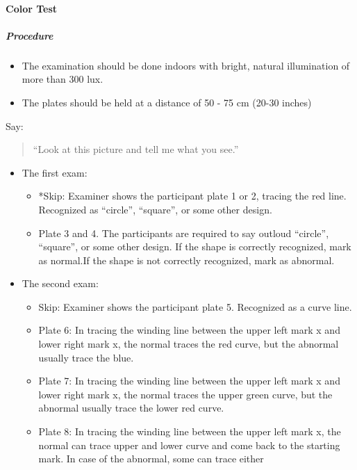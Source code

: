 \documentclass[]{article}
\providecommand{\tightlist}{%
  \setlength{\itemsep}{0pt}\setlength{\parskip}{0pt}}
\let\oldparagraph\paragraph
\renewcommand{\paragraph}[1]{\oldparagraph{#1}\mbox{}}
\let\oldsubparagraph\subparagraph
\renewcommand{\subparagraph}[1]{\oldsubparagraph{#1}\mbox{}}
\begin{document}
\paragraph{Color Test}\label{color-test}

\subparagraph{Procedure}\label{procedure-1}

\begin{itemize}
\tightlist
\item
  The examination should be done indoors with bright, natural
  illumination of more than 300 lux.
\item
  The plates should be held at a distance of 50 - 75 cm (20-30 inches)
\end{itemize}

Say:

\begin{quote}
``Look at this picture and tell me what you see.''
\end{quote}

\begin{itemize}
\tightlist
\item
  The first exam:

  \begin{itemize}
  \tightlist
  \item
    *Skip: Examiner shows the participant plate 1 or 2, tracing the red
    line. Recognized as ``circle'', ``square'', or some other design.
  \item
    Plate 3 and 4. The participants are required to say outloud
    ``circle'', ``square'', or some other design. If the shape is
    correctly recognized, mark as normal.If the shape is not correctly
    recognized, mark as abnormal.
  \end{itemize}
\item
  The second exam:

  \begin{itemize}
  \tightlist
  \item
    Skip: Examiner shows the participant plate 5. Recognized as a curve
    line.
  \item
    Plate 6: In tracing the winding line between the upper left mark x
    and lower right mark x, the normal traces the red curve, but the
    abnormal usually trace the blue.
  \item
    Plate 7: In tracing the winding line between the upper left mark x
    and lower right mark x, the normal traces the upper green curve, but
    the abnormal usually trace the lower red curve.
  \item
    Plate 8: In tracing the winding line between the upper left mark x,
    the normal can trace upper and lower curve and come back to the
    starting mark. In case of the abnormal, some can trace either
  \end{itemize}
\end{itemize}
\end{document}
